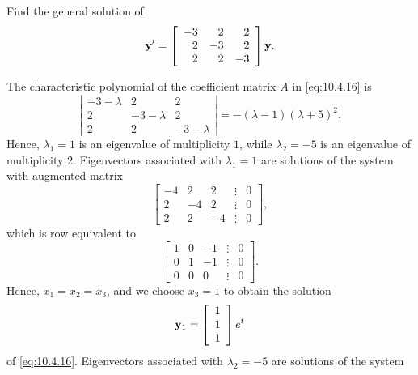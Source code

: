 \setcounter{example}{2}
\setcounter{equation}{15}
\begin{example}
  \label{example:10.4.3}\rm Find the general solution of
  \begin{equation}
    \label{eq:10.4.16}{\bf y}'=\left[
    \begin{array}{rrr}
      -3 & 2  & 2  \\
      2  & -3 & 2  \\
      2  & 2  & -3
    \end{array}\right]{\bf y}.
  \end{equation}
\end{example}
\setcounter{equation}{16}
\begin{examplesolution}
\solution The characteristic polynomial of the coefficient matrix $A$ in \eqref{eq:10.4.16} is
\[
  \left|
  \begin{array}{ccc}
    -3-\lambda & 2          & 2          \\
    2          & -3-\lambda & 2          \\
    2          & 2          & -3-\lambda
  \end{array}\right|=-(\lambda-1)(\lambda+5)^{2}.
\]
Hence, $\lambda_{1}=1$ is an eigenvalue of multiplicity $1$, while $\lambda_{2}=-5$ is an eigenvalue
of multiplicity $2$. Eigenvectors associated with $\lambda_{1}=1$ are solutions of the system with
augmented matrix
\[
  \left[
  \begin{array}{rrrcr}
    -4 & 2  & 2  & \vdots & 0 \\
    2  & -4 & 2  & \vdots & 0 \\
    2  & 2  & -4 & \vdots & 0
  \end{array}\right],
\]
which is row equivalent to
\[
  \left[
  \begin{array}{rrrcr}
    1 & 0 & -1 & \vdots & 0 \\
    0 & 1 & -1 & \vdots & 0 \\
    0 & 0 & 0  & \vdots & 0
  \end{array}\right].
\]
Hence, $x_{1}=x_{2}=x_{3}$, and we choose $x_{3}=1$ to obtain the solution
\begin{equation}
  \label{eq:10.4.17}{\bf y}_{1}=\left[
  \begin{array}{r}
    1 \\
    1 \\
    1
  \end{array}\right]e^{t}
\end{equation}
of \eqref{eq:10.4.16}. Eigenvectors associated with $\lambda_{2}=-5$ are solutions of the system

\end{examplesolution}
